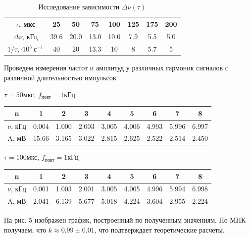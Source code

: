 \documentclass[12pt,a4paper]{article}
\begin{document}
\begin{table}[h!]
    \centering
    \begin{tabular}[]{|c|c|c|c|c|c|c|c|}
        \hline
        $\tau$, мкс & 25 & 50 & 75& 100& 125& 175& 200\\
        \hline
        $\Delta \nu$, кГц & 39.6 & 20.0 & 13.0 & 10.0 & 7.9& 5.5& 5.0\\
        \hline
        $1/\tau, \cdot 10^3\ с^{-1}$ & 40 & 20 & 13.3 & 10 & 8 & 5.7 & 5\\
        \hline
    \end{tabular}
    \caption{Исследование зависимости $\Delta \nu (\tau)$}
\end{table}

Проведем измерения частот и амплитуд у различных гармоник сигналов с различной длительностью импульсов
\begin{table}[h!]
    \centering
    $\tau = 50$мкс, $f_{повт} = 1$кГц

    \begin{tabular}[]{|c|c|c|c|c|c|c|c|c|}
        \hline
        n & 1&2&3&4&5&6&7&8\\
        \hline
        $\nu$, кГц & 0.004&1.000&2.003&3.005&4.006&4.993&5.996&6.997\\
        \hline
        A, мВ&15.66&3.165&3.022&2.815&2.625&2.522&2.514&2.450\\
        \hline
    \end{tabular}
\end{table}

\begin{table}[h!]
    \centering
    $\tau = 100$мкс, $f_{повт} = 1$кГц

    \begin{tabular}[]{|c|c|c|c|c|c|c|c|c|}
        \hline
        n & 1& 2& 3& 4& 5 & 6& 7& 8\\
        \hline
        $\nu$, кГц &  0.001& 1.003& 2.001& 3.005& 4.005& 4.996& 5.994& 6.998\\
        \hline
        A, мВ& 2.041& 6.139& 5.677& 5.018& 4.224 & 3.604& 2.955 &2.224\\
        \hline
    \end{tabular}
\end{table}

На рис. 5 изображен график, построенный по полученным значениям.
По МНК получаем, что $k\approx 0.99 \pm 0.01$, что подтверждает теоретические расчеты.
\end{document}
